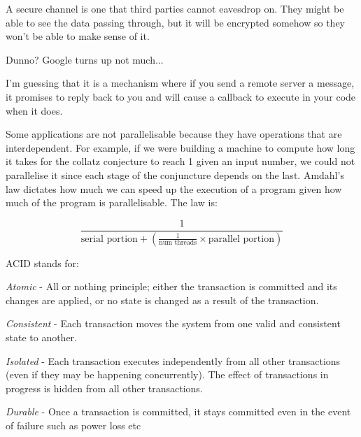 A secure channel is one that third parties cannot eavesdrop on. They might be
able to see the data passing through, but it will be encrypted somehow so they
won’t be able to make sense of it.


Dunno? Google turns up not much...

I’m guessing that it is a mechanism where if you send a remote server a message,
it promises to reply back to you and will cause a callback to execute in your
code when it does.

\newpage


Some applications are not parallelisable because they have operations that are
interdependent. For example, if we were building a machine to compute how long
it takes for the collatz conjecture to reach 1 given an input number, we could
not parallelise it since each stage of the conjuncture depends on the last.
Amdahl’s law dictates how much we can speed up the execution of a program given
how much of the program is parallelisable. The law is:

\[
  \frac{1}{\text{serial portion} + (\frac{1}{\text{num threads}} \times \text{parallel portion})}
\]


ACID stands for:
\begin{description}
  \item \textit{Atomic} - All or nothing principle; either the transaction is
  committed and its changes are applied, or no state is changed as a result of
  the transaction.

  \item \textit{Consistent} - Each transaction moves the system from one valid
  and consistent state to another.

  \item \textit{Isolated} - Each transaction executes independently from all
  other transactions (even if they may be happening concurrently). The effect of
  transactions in progress is hidden from all other transactions.

  \item \textit{Durable} - Once a transaction is committed, it stays committed
  even in the event of failure such as power loss etc
\end{description}

